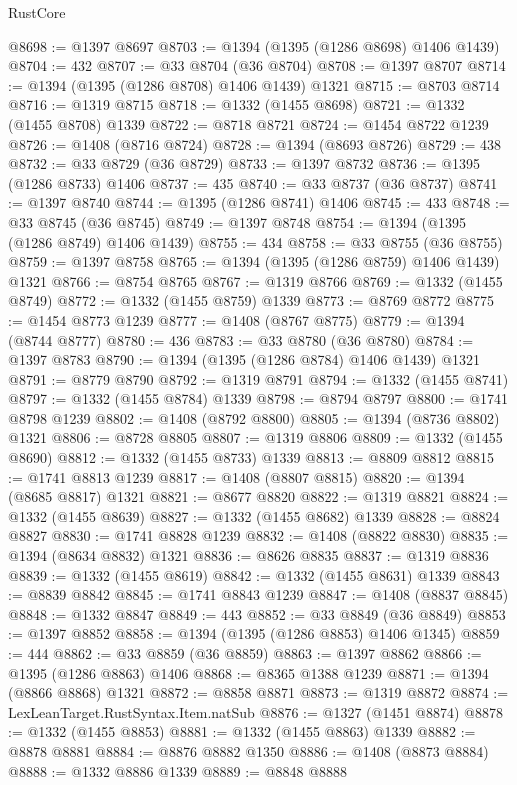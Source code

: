\begin{lexlean}{RustCore}
\begin{coremodule}
@8698 := @1397 @8697
@8703 := @1394 (@1395 (@1286 @8698) @1406 @1439)
@8704 := 432
@8707 := @33 @8704 (@36 @8704)
@8708 := @1397 @8707
@8714 := @1394 (@1395 (@1286 @8708) @1406 @1439) @1321
@8715 := @8703 @8714
@8716 := @1319 @8715
@8718 := @1332 (@1455 @8698)
@8721 := @1332 (@1455 @8708) @1339
@8722 := @8718 @8721
@8724 := @1454 @8722 @1239
@8726 := @1408 (@8716 @8724)
@8728 := @1394 (@8693 @8726)
@8729 := 438
@8732 := @33 @8729 (@36 @8729)
@8733 := @1397 @8732
@8736 := @1395 (@1286 @8733) @1406
@8737 := 435
@8740 := @33 @8737 (@36 @8737)
@8741 := @1397 @8740
@8744 := @1395 (@1286 @8741) @1406
@8745 := 433
@8748 := @33 @8745 (@36 @8745)
@8749 := @1397 @8748
@8754 := @1394 (@1395 (@1286 @8749) @1406 @1439)
@8755 := 434
@8758 := @33 @8755 (@36 @8755)
@8759 := @1397 @8758
@8765 := @1394 (@1395 (@1286 @8759) @1406 @1439) @1321
@8766 := @8754 @8765
@8767 := @1319 @8766
@8769 := @1332 (@1455 @8749)
@8772 := @1332 (@1455 @8759) @1339
@8773 := @8769 @8772
@8775 := @1454 @8773 @1239
@8777 := @1408 (@8767 @8775)
@8779 := @1394 (@8744 @8777)
@8780 := 436
@8783 := @33 @8780 (@36 @8780)
@8784 := @1397 @8783
@8790 := @1394 (@1395 (@1286 @8784) @1406 @1439) @1321
@8791 := @8779 @8790
@8792 := @1319 @8791
@8794 := @1332 (@1455 @8741)
@8797 := @1332 (@1455 @8784) @1339
@8798 := @8794 @8797
@8800 := @1741 @8798 @1239
@8802 := @1408 (@8792 @8800)
@8805 := @1394 (@8736 @8802) @1321
@8806 := @8728 @8805
@8807 := @1319 @8806
@8809 := @1332 (@1455 @8690)
@8812 := @1332 (@1455 @8733) @1339
@8813 := @8809 @8812
@8815 := @1741 @8813 @1239
@8817 := @1408 (@8807 @8815)
@8820 := @1394 (@8685 @8817) @1321
@8821 := @8677 @8820
@8822 := @1319 @8821
@8824 := @1332 (@1455 @8639)
@8827 := @1332 (@1455 @8682) @1339
@8828 := @8824 @8827
@8830 := @1741 @8828 @1239
@8832 := @1408 (@8822 @8830)
@8835 := @1394 (@8634 @8832) @1321
@8836 := @8626 @8835
@8837 := @1319 @8836
@8839 := @1332 (@1455 @8619)
@8842 := @1332 (@1455 @8631) @1339
@8843 := @8839 @8842
@8845 := @1741 @8843 @1239
@8847 := @1408 (@8837 @8845)
@8848 := @1332 @8847
@8849 := 443
@8852 := @33 @8849 (@36 @8849)
@8853 := @1397 @8852
@8858 := @1394 (@1395 (@1286 @8853) @1406 @1345)
@8859 := 444
@8862 := @33 @8859 (@36 @8859)
@8863 := @1397 @8862
@8866 := @1395 (@1286 @8863) @1406
@8868 := @8365 @1388 @1239
@8871 := @1394 (@8866 @8868) @1321
@8872 := @8858 @8871
@8873 := @1319 @8872
@8874 := LexLeanTarget.RustSyntax.Item.natSub
@8876 := @1327 (@1451 @8874)
@8878 := @1332 (@1455 @8853)
@8881 := @1332 (@1455 @8863) @1339
@8882 := @8878 @8881
@8884 := @8876 @8882 @1350
@8886 := @1408 (@8873 @8884)
@8888 := @1332 @8886 @1339
@8889 := @8848 @8888

\end{coremodule}
\end{lexlean}
